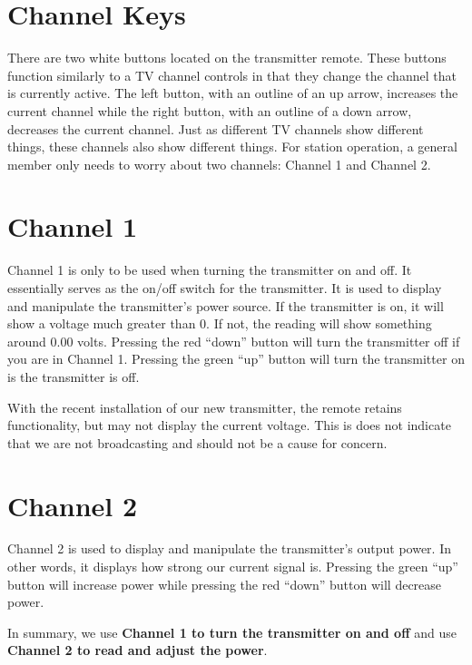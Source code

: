\documentclass{witrman}
\begin{document}
\section{Channel Keys}
There are two white buttons located on the transmitter remote. These buttons
function similarly to a TV channel controls in that they change the channel that
is currently active. The left button, with an outline of an up arrow, increases
the current channel while the right button, with an outline of a down arrow,
decreases the current channel. Just as different TV channels show different
things, these channels also show different things. For station operation, a
general member only needs to worry about two channels: Channel 1 and Channel 2.

\section{Channel 1}
Channel 1 is only to be used when turning the transmitter on and off. It
essentially serves as the on/off switch for the transmitter. It is used to
display and manipulate the transmitter’s power source. If the transmitter is on,
it will show a voltage much greater than 0. If not, the reading will show
something around 0.00 volts. Pressing the red ``down'' button will turn the
transmitter off if you are in Channel 1. Pressing the green ``up'' button will
turn the transmitter on is the transmitter is off.

With the recent installation of our new transmitter, the remote retains
functionality, but may not display the current voltage. This is does not
indicate that we are not broadcasting and should not be a cause for concern.

\section{Channel 2}
Channel 2 is used to display and manipulate the transmitter’s output power. In
other words, it displays how strong our current signal is. Pressing the green
``up'' button will increase power while pressing the red ``down'' button will
decrease power.

In summary, we use \textbf{Channel 1 to turn the transmitter on and off} and use
\textbf{Channel 2 to read and adjust the power}.
\end{document}
